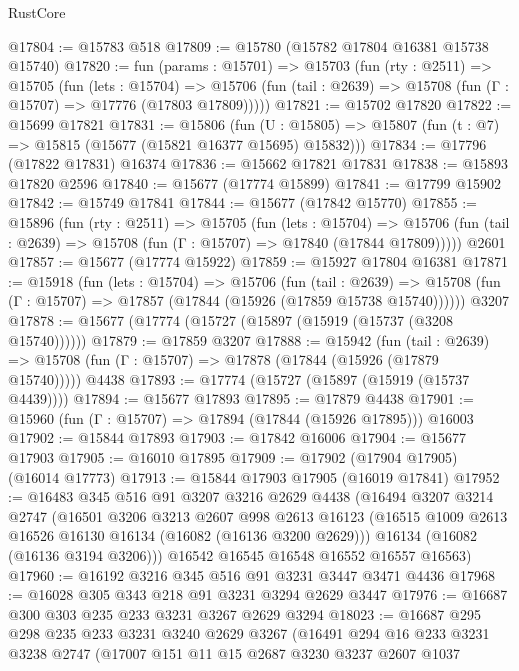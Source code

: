 \begin{lexlean}{RustCore}
\begin{coremodule}
@17804 := @15783 @518
@17809 := @15780 (@15782 @17804 @16381 @15738 @15740)
@17820 := fun (params : @15701) =>
  @15703
    (fun (rty : @2511) =>
    @15705
      (fun (lets : @15704) =>
      @15706 (fun (tail : @2639) => @15708 (fun (Γ : @15707) => @17776 (@17803 @17809)))))
@17821 := @15702 @17820
@17822 := @15699 @17821
@17831 := @15806
    (fun (U : @15805) => @15807 (fun (t : @7) => @15815 (@15677 (@15821 @16377 @15695) @15832)))
@17834 := @17796 (@17822 @17831) @16374
@17836 := @15662 @17821 @17831
@17838 := @15893 @17820 @2596
@17840 := @15677 (@17774 @15899)
@17841 := @17799 @15902
@17842 := @15749 @17841
@17844 := @15677 (@17842 @15770)
@17855 := @15896
    (fun (rty : @2511) =>
    @15705
      (fun (lets : @15704) =>
      @15706 (fun (tail : @2639) => @15708 (fun (Γ : @15707) => @17840 (@17844 @17809)))))
    @2601
@17857 := @15677 (@17774 @15922)
@17859 := @15927 @17804 @16381
@17871 := @15918
    (fun (lets : @15704) =>
    @15706
      (fun (tail : @2639) =>
      @15708 (fun (Γ : @15707) => @17857 (@17844 (@15926 (@17859 @15738 @15740))))))
    @3207
@17878 := @15677 (@17774 (@15727 (@15897 (@15919 (@15737 (@3208 @15740))))))
@17879 := @17859 @3207
@17888 := @15942
    (fun (tail : @2639) => @15708 (fun (Γ : @15707) => @17878 (@17844 (@15926 (@17879 @15740)))))
    @4438
@17893 := @17774 (@15727 (@15897 (@15919 (@15737 @4439))))
@17894 := @15677 @17893
@17895 := @17879 @4438
@17901 := @15960 (fun (Γ : @15707) => @17894 (@17844 (@15926 @17895))) @16003
@17902 := @15844 @17893
@17903 := @17842 @16006
@17904 := @15677 @17903
@17905 := @16010 @17895
@17909 := @17902 (@17904 @17905) (@16014 @17773)
@17913 := @15844 @17903 @17905 (@16019 @17841)
@17952 := @16483
    @345
    @516
    @91
    @3207
    @3216
    @2629
    @4438
    (@16494
      @3207
      @3214
      @2747
      (@16501
        @3206
        @3213
        @2607
        @998
        @2613
        @16123
        (@16515 @1009 @2613 @16526 @16130 @16134 (@16082 (@16136 @3200 @2629)))
        @16134
        (@16082 (@16136 @3194 @3206)))
      @16542
      @16545
      @16548
      @16552
      @16557
      @16563)
@17960 := @16192 @3216 @345 @516 @91 @3231 @3447 @3471 @4436
@17968 := @16028 @305 @343 @218 @91 @3231 @3294 @2629 @3447
@17976 := @16687 @300 @303 @235 @233 @3231 @3267 @2629 @3294
@18023 := @16687
    @295
    @298
    @235
    @233
    @3231
    @3240
    @2629
    @3267
    (@16491
      @294
      @16
      @233
      @3231
      @3238
      @2747
      (@17007
        @151
        @11
        @15
        @2687
        @3230
        @3237
        @2607
        @1037

\end{coremodule}
\end{lexlean}
